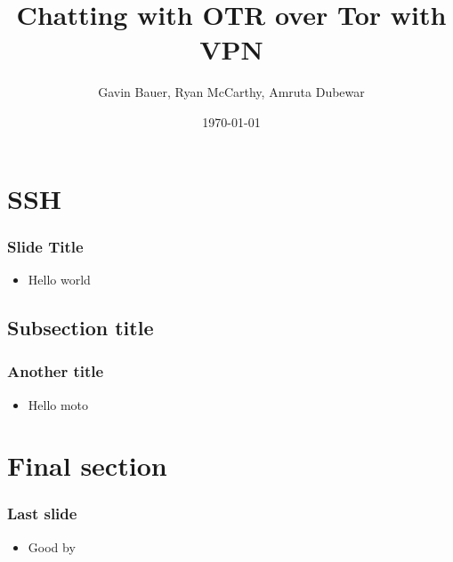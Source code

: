 \documentclass{beamer}
\title{Chatting with OTR over Tor with VPN}
\author{Gavin Bauer, Ryan McCarthy, Amruta Dubewar}
\date{\today}
\begin{document}
\begin{frame}
\maketitle
\end{frame}
\section{SSH}
\begin{frame}
\frametitle{Slide Title}
\begin{itemize}
\item Hello world
\end{itemize}
\end{frame}
\subsection{Subsection title}
\begin{frame}
\frametitle{Another title}
\begin{itemize}
\item Hello moto
\end{itemize}
\end{frame}
\section{Final section}
\begin{frame}
\frametitle{Last slide}
\begin{itemize}
\item Good by
\end{itemize}
\end{frame}
\end{document}
